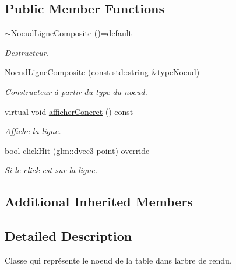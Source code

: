 \subsection*{Public Member Functions}
\begin{DoxyCompactItemize}
\item 
\hypertarget{class_noeud_ligne_composite_a08087529aaf006ad8708d276f96c1424}{}\hyperlink{class_noeud_ligne_composite_a08087529aaf006ad8708d276f96c1424}{$\sim$\+Noeud\+Ligne\+Composite} ()=default\label{class_noeud_ligne_composite_a08087529aaf006ad8708d276f96c1424}

\begin{DoxyCompactList}\small\item\em Destructeur. \end{DoxyCompactList}\end{DoxyCompactItemize}
{\bf }\par
\begin{DoxyCompactItemize}
\item 
\hyperlink{class_noeud_ligne_composite_af9846268635cbb0331feab18575c2607}{Noeud\+Ligne\+Composite} (const std\+::string \&type\+Noeud)
\begin{DoxyCompactList}\small\item\em Constructeur à partir du type du noeud. \end{DoxyCompactList}\item 
virtual void \hyperlink{class_noeud_ligne_composite_a24738e9ba75c1b0d69e5a99edcba1682}{afficher\+Concret} () const 
\begin{DoxyCompactList}\small\item\em Affiche la ligne. \end{DoxyCompactList}\item 
bool \hyperlink{class_noeud_ligne_composite_a0cb225b44480c5630d13d3fee60ccbf9}{click\+Hit} (glm\+::dvec3 point) override
\begin{DoxyCompactList}\small\item\em Si le click est sur la ligne. \end{DoxyCompactList}\end{DoxyCompactItemize}

\subsection*{Additional Inherited Members}


\subsection{Detailed Description}
Classe qui représente le noeud de la table dans l\textquotesingle{}arbre de rendu. 

